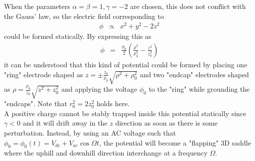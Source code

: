 \documentclass{article}
\begin{document}
When the parameters $\alpha = \beta = 1, \gamma = -2$ are chosen, this does not conflict with the Gauss' law, so the electric field corresponding to
\begin{eqnarray*}
\phi & \propto & x^2 + y^2 - 2z^2
\end{eqnarray*}
could be formed statically. By expressing this as
\begin{eqnarray*}
\phi & = & \frac{\phi_0}{2} \left( \frac{\rho^2}{\rho_0^2} - \frac{z^2}{z_0^2} \right)
\end{eqnarray*}
it can be understood that this kind of potential could be formed by placing one "ring" electrode shaped as $z = \pm \frac{z_0}{\rho_0}\sqrt{ \rho^2 + \rho_0^2}$ and two "endcap" electrodes shaped as $\rho = \frac{\rho_0}{z_0}\sqrt{z^2 + z_0^2}$ and applying the voltage $\phi_0$ to the "ring" while grounding the "endcaps". Note that $r_0^2 = 2z_0^2$ holds here. \\

A positive charge cannot be stably trapped inside this potential statically since $\gamma < 0$ and it will drift away in the $z$ direction as soon as there is some perturbation. Instead, by using an AC voltage such that $\phi_0 = \phi_0(t) = V_{dc} + V_{ac} \cos{\Omega t}$, the potential will become a "flapping" 3D saddle where the uphill and downhill direction interchange at a frequency $\Omega$. 


\begin{thebibliography}{9}

\end{thebibliography}
\end{document}
